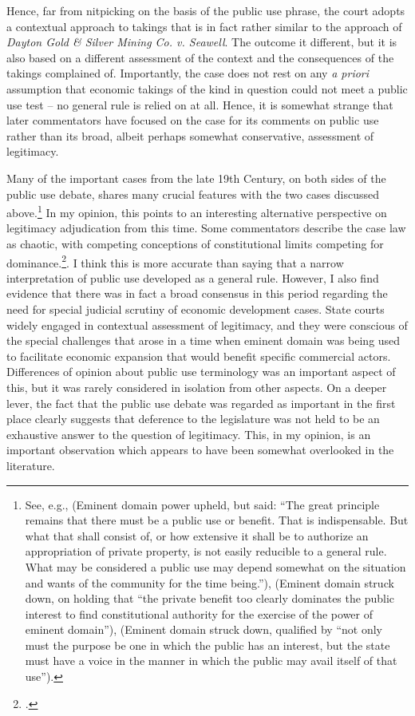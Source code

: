 Hence, far from nitpicking on the basis of the public use phrase, the court adopts a contextual approach to takings that is in fact rather similar to the approach of {\it Dayton Gold \& Silver Mining Co. v. Seawell}. The outcome it different, but it is also based on a different assessment of the context and the consequences of the takings complained of. Importantly, the case does not rest on any {\it a priori} assumption that economic takings of the kind in question could not meet a public use test -- no general rule is relied on at all. Hence, it is somewhat strange that later commentators have focused on the case for its comments on public use rather than its broad, albeit perhaps somewhat conservative, assessment of legitimacy. 

Many of the important cases from the late 19th Century, on both sides of the public use debate, shares many crucial features with the two cases discussed above.\footnote{See, e.g., \cite{scudder32} (Eminent domain power upheld, but said: ``The great principle remains that there must be a public use or benefit. That is indispensable. But what that shall consist of, or how extensive it shall be to authorize an appropriation of private property, is not easily reducible to a general rule. What may be considered a public use may depend somewhat on the situation and wants of the community for the time being.''), \cite{fallsburg03} (Eminent domain struck down, on holding that ``the private benefit too clearly dominates the public interest to find constitutional authority for the exercise of the power of eminent domain''), \cite[538]{board91} (Eminent domain struck down, qualified by ``not only must the purpose be one in which the public has an interest, but the state must have a voice in the manner in which the public may avail itself of that use'').} In my opinion, this points to an interesting alternative perspective on legitimacy adjudication from this time. Some commentators describe the case law as chaotic, with competing conceptions of constitutional limits competing for dominance.\footcite{berger78,meidinger80}. I think this is more accurate than saying that a narrow interpretation of public use developed as a general rule. However, I also find evidence that there was in fact a broad consensus in this period regarding the need for special judicial scrutiny of economic development cases. State courts widely engaged in contextual assessment of legitimacy, and they were conscious of the special challenges that arose in a time when eminent domain was being used to facilitate economic expansion that would benefit specific commercial actors. Differences of opinion about public use terminology was an important aspect of this, but it was rarely considered in isolation from other aspects. On a deeper lever, the fact that the public use debate was regarded as important in the first place clearly suggests that deference to the legislature was not held to be an exhaustive answer to the question of legitimacy. This, in my opinion, is an important observation which appears to have been somewhat overlooked in the literature. 

